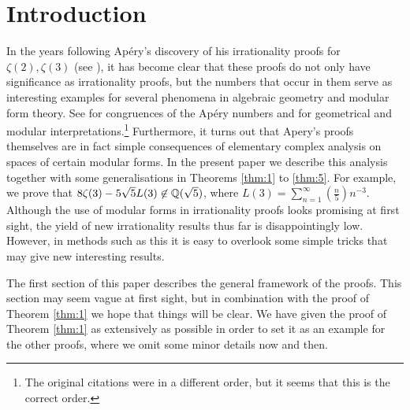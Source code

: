 \section{Introduction}

In the years following Ap\'ery's discovery of his irrationality proofs for $\zeta(2), \zeta(3)$ (see \cite{van1979proof}), it has become clear that these proofs do not only have significance as irrationality proofs, but the numbers that occur in them serve as interesting examples for several phenomena in algebraic geometry and modular form theory.
See \cite{beukers1982irrationality,beukers1985some,beukers1987another,gessel1982some} for congruences of the Ap\'ery numbers and \cite{beukers1984family,stienstra1985picard} for geometrical and modular interpretations.\footnote{The original citations were in a different order, but it seems that this is the correct order.}
Furthermore, it turns out that Apery's proofs themselves are in fact simple consequences of elementary complex analysis on spaces of certain modular forms.
In the present paper we describe this analysis together with some generalisations in Theorems \ref{thm:1} to \ref{thm:5}. 
For example, we prove that $8\zeta(3) - 5 \sqrt{5} L(3) \not \in \mathbb{Q}(\sqrt{5})$, where $L(3) = \sum_{n=1}^{\infty} \left(\frac{n}{5}\right) n^{-3}$.
Although the use of modular forms in irrationality proofs looks promising at first sight, the yield of new irrationality results thus far is disappointingly low. 
However, in methods such as this it is easy to overlook some simple tricks that may give new interesting results.

The first section of this paper describes the general framework of the proofs.
This section may seem vague at first sight, but in combination with the proof of Theorem \ref{thm:1} we hope that things will be clear.
We have given the proof of Theorem \ref{thm:1} as extensively as possible in order to set it as an example for the other proofs, where we omit some minor details now and then. 